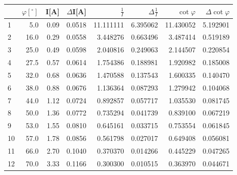 \begin{tabular}{lrrrrrrr}
\toprule
{} &  $\varphi[^\circ]$ &  I[A] &  $\Delta$I[A] &  $\frac{1}{I}$ &  $\Delta \frac{1}{I}$ &  $\cot{\varphi}$ &  $\Delta \cot{\varphi}$ \\
\midrule
1  &                5.0 &  0.09 &        0.0518 &      11.111111 &              6.395062 &        11.430052 &                5.192901 \\
2  &               16.0 &  0.29 &        0.0558 &       3.448276 &              0.663496 &         3.487414 &                0.519189 \\
3  &               25.0 &  0.49 &        0.0598 &       2.040816 &              0.249063 &         2.144507 &                0.220854 \\
4  &               27.5 &  0.57 &        0.0614 &       1.754386 &              0.188981 &         1.920982 &                0.185008 \\
5  &               32.0 &  0.68 &        0.0636 &       1.470588 &              0.137543 &         1.600335 &                0.140470 \\
6  &               38.0 &  0.88 &        0.0676 &       1.136364 &              0.087293 &         1.279942 &                0.104068 \\
7  &               44.0 &  1.12 &        0.0724 &       0.892857 &              0.057717 &         1.035530 &                0.081745 \\
8  &               50.0 &  1.36 &        0.0772 &       0.735294 &              0.041739 &         0.839100 &                0.067219 \\
9  &               53.0 &  1.55 &        0.0810 &       0.645161 &              0.033715 &         0.753554 &                0.061845 \\
10  &               57.0 &  1.78 &        0.0856 &       0.561798 &              0.027017 &         0.649408 &                0.056081 \\
11 &               66.0 &  2.70 &        0.1040 &       0.370370 &              0.014266 &         0.445229 &                0.047265 \\
12 &               70.0 &  3.33 &        0.1166 &       0.300300 &              0.010515 &         0.363970 &                0.044671 \\
\bottomrule
\end{tabular}
